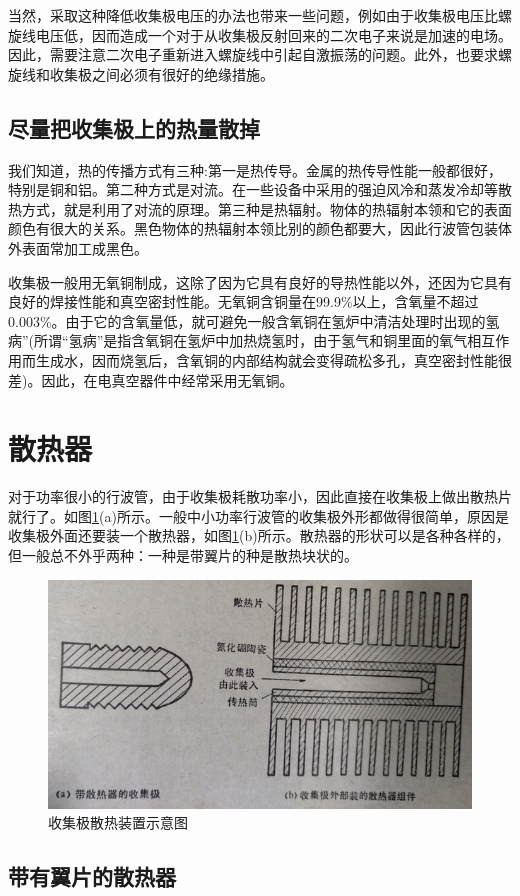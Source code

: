 当然，采取这种降低收集极电压的办法也带来一些问题，例如由于收集极电压比螺旋线电压低，因而造成一个对于从收集极反射回来的二次电子来说是加速的电场。因此，需要注意二次电子重新进入螺旋线中引起自激振荡的问题。此外，也要求螺旋线和收集极之间必须有很好的绝缘措施。

\subsection{尽量把收集极上的热量散掉}
我们知道，热的传播方式有三种:第一是热传导。金属的热传导性能一般都很好，特别是铜和铝。第二种方式是对流。在一些设备中采用的强迫风冷和蒸发冷却等散热方式，就是利用了对流的原理。第三种是热辐射。物体的热辐射本领和它的表面颜色有很大的关系。黑色物体的热辐射本领比别的颜色都要大，因此行波管包装体外表面常加工成黑色。


收集极一般用无氧铜制成，这除了因为它具有良好的导热性能以外，还因为它具有良好的焊接性能和真空密封性能。无氧铜含铜量在99.9\%以上，含氧量不超过0.003\%。由于它的含氧量低，就可避免一般含氧铜在氢炉中清洁处理时出现的氢病”(所谓“氢病”是指含氧铜在氢炉中加热烧氢时，由于氢气和铜里面的氧气相互作用而生成水，因而烧氢后，含氧铜的内部结构就会变得疏松多孔，真空密封性能很差)。因此，在电真空器件中经常采用无氧铜。



\section{散热器}
对于功率很小的行波管，由于收集极耗散功率小，因此直接在收集极上做出散热片就行了。如图\ref{ch8-1}(a)所示。一般中小功率行波管的收集极外形都做得很简单，原因是收集极外面还要装一个散热器，如图\ref{ch8-1}(b)所示。散热器的形状可以是各种各样的，但一般总不外乎两种：一种是带翼片的种是散热块状的。
\begin{figure}[phtb]
	\centering
	\includegraphics[width=0.75\linewidth]{figure/ch8-1}
	\caption{ 收集极散热装置示意图}
	\label{ch8-1}
\end{figure}

\subsection{带有翼片的散热器}


